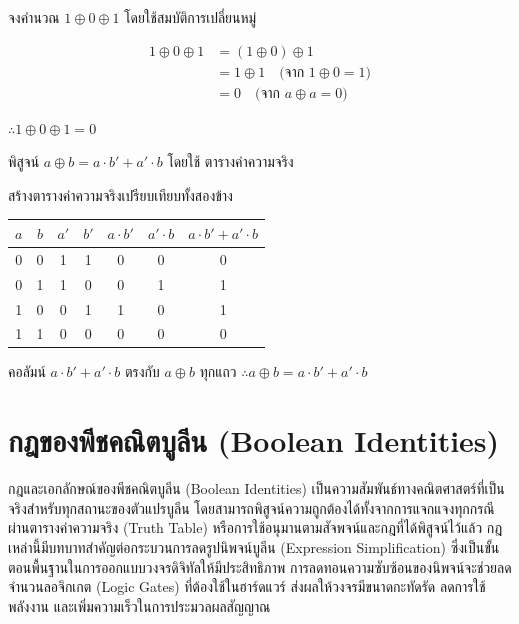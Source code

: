 \begin{ex}
\label{ex:eval-xor-chain}
จงคำนวณ $1 \oplus 0 \oplus 1$ โดยใช้สมบัติการเปลี่ยนหมู่
\end{ex}
\begin{solution}
\begin{align*}
1 \oplus 0 \oplus 1 &= (1 \oplus 0) \oplus 1 \\
                   &= 1 \oplus 1 \quad \text{(จาก } 1 \oplus 0 = 1 \text{)} \\
                   &= 0 \quad \text{(จาก } a \oplus a = 0 \text{)}
\end{align*}

$\therefore 1 \oplus 0 \oplus 1 = 0$ \solhere
\end{solution}

\begin{ex}
\label{ex:xor-equivalence}
พิสูจน์ $a \oplus b = a \cdot b' + a' \cdot b$ โดยใช้ ตารางค่าความจริง
\end{ex}
\begin{solution}
สร้างตารางค่าความจริงเปรียบเทียบทั้งสองข้าง
\begin{center}
\begin{tabular}{|c|c|c|c|c|c|c|}
\hline
$a$ & $b$ & $a'$ & $b'$ & $a \cdot b'$ & $a' \cdot b$ & $a \cdot b' + a' \cdot b$ \\
\hline
0 & 0 & 1 & 1 & 0 & 0 & 0 \\
\hline
0 & 1 & 1 & 0 & 0 & 1 & 1 \\
\hline
1 & 0 & 0 & 1 & 1 & 0 & 1 \\
\hline
1 & 1 & 0 & 0 & 0 & 0 & 0 \\
\hline
\end{tabular}
\end{center}
คอลัมน์ $a \cdot b' + a' \cdot b$ ตรงกับ $a \oplus b$ ทุกแถว $\therefore a \oplus b = a \cdot b' + a' \cdot b$ \solhere
\end{solution}

\section{กฎของพีชคณิตบูลีน (Boolean Identities)}
\label{sec:boolean-identities}

กฎและเอกลักษณ์ของพีชคณิตบูลีน (Boolean Identities) เป็นความสัมพันธ์ทางคณิตศาสตร์ที่เป็นจริงสำหรับทุกสถานะของตัวแปรบูลีน โดยสามารถพิสูจน์ความถูกต้องได้ทั้งจากการแจกแจงทุกกรณีผ่านตารางค่าความจริง (Truth Table) หรือการใช้อนุมานตามสัจพจน์และกฎที่ได้พิสูจน์ไว้แล้ว กฎเหล่านี้มีบทบาทสำคัญต่อกระบวนการลดรูปนิพจน์บูลีน (Expression Simplification) ซึ่งเป็นขั้นตอนพื้นฐานในการออกแบบวงจรดิจิทัลให้มีประสิทธิภาพ การลดทอนความซับซ้อนของนิพจน์จะช่วยลดจำนวนลอจิกเกต (Logic Gates) ที่ต้องใช้ในฮาร์ดแวร์ ส่งผลให้วงจรมีขนาดกะทัดรัด ลดการใช้พลังงาน และเพิ่มความเร็วในการประมวลผลสัญญาณ~\parencite{mano2018digital}

